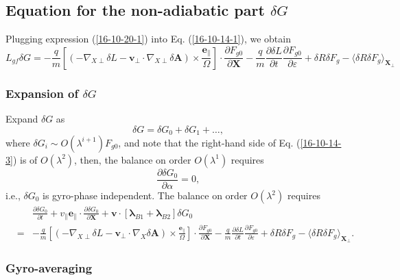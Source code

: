 \documentclass{article}
\newcommand{\tmmathbf}[1]{\ensuremath{\boldsymbol{#1}}}
\begin{document}
\subsection{Equation for the non-adiabatic part $\delta G$}

Plugging expression (\ref{16-10-20-1}) into Eq. (\ref{16-10-14-1}), we obtain
\begin{equation}
  \label{16-10-14-3} L_{g f} \delta G = - \frac{q}{m} \left[ (- \nabla_{X
  \perp} \delta L -\mathbf{v}_{\perp} \cdot \nabla_{X \perp} \delta
  \mathbf{A}) \times \frac{\tmmathbf{e}_{\parallel}}{\Omega} \right] \cdot
  \frac{\partial F_{g 0}}{\partial \mathbf{X}} - \frac{q}{m}  \frac{\partial
  \delta L}{\partial t}  \frac{\partial F_{g 0}}{\partial \varepsilon} +
  \delta R \delta F_g - \langle \delta R \delta F_g
  \rangle_{\mathbf{X}_{\perp}}
\end{equation}
\subsubsection{Expansion of $\delta G$}\label{17-5-5-p1}

Expand $\delta G$ as
\[ \delta G = \delta G_0 + \delta G_1 + \ldots, \]
where $\delta G_i \sim O (\lambda^{i + 1}) F_{g 0}$, and note that the
right-hand side of Eq. (\ref{16-10-14-3}) is of $O (\lambda^2)$, then, the
balance on order $O (\lambda^1)$ requires
\begin{equation}
  \frac{\partial \delta G_0}{\partial \alpha} = 0,
\end{equation}
i.e., $\delta G_0$ is gyro-phase independent. The balance on order $O
(\lambda^2)$ requires
\begin{eqnarray}
  &  & \frac{\partial \delta G_0}{\partial t} + v_{\parallel}
  \mathbf{e}_{\parallel} \cdot \frac{\partial \delta G_0}{\partial \mathbf{X}}
  +\mathbf{v} \cdot [\tmmathbf{\lambda}_{B 1} +\tmmathbf{\lambda}_{B 2}]
  \delta G_0 \nonumber\\
  & = & - \frac{q}{m} \left[ (- \nabla_{X \perp} \delta L -\mathbf{v}_{\perp}
  \cdot \nabla_X \delta \mathbf{A}) \times
  \frac{\tmmathbf{e}_{\parallel}}{\Omega} \right] \cdot \frac{\partial F_{g
  0}}{\partial \mathbf{X}} - \frac{q}{m}  \frac{\partial \delta L}{\partial t}
  \frac{\partial F_{g 0}}{\partial \varepsilon} + \delta R \delta F_g -
  \langle \delta R \delta F_g \rangle_{\mathbf{X}_{\perp}} . 
  \label{18-9-11-p1}
\end{eqnarray}

\subsubsection{Gyro-averaging}
\end{document}
